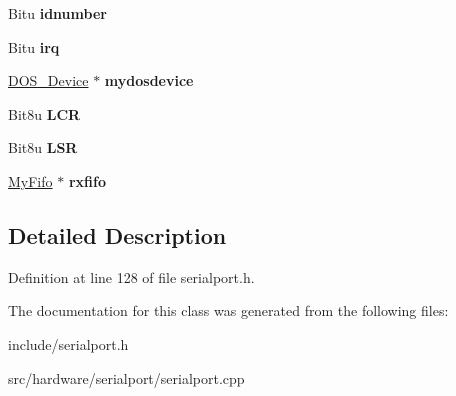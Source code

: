 \begin{DoxyCompactItemize}
\item 
\hypertarget{classCSerial_a8c544ffae840bf00e8185eee2b176ccc}{Bitu {\bfseries idnumber}}\label{classCSerial_a8c544ffae840bf00e8185eee2b176ccc}

\item 
\hypertarget{classCSerial_ac7142618a6f82ffd683cc1a8936fb5eb}{Bitu {\bfseries irq}}\label{classCSerial_ac7142618a6f82ffd683cc1a8936fb5eb}

\item 
\hypertarget{classCSerial_a805edbbeb60acbbb3d06defa286bd8fb}{\hyperlink{classDOS__Device}{D\-O\-S\-\_\-\-Device} $\ast$ {\bfseries mydosdevice}}\label{classCSerial_a805edbbeb60acbbb3d06defa286bd8fb}

\item 
\hypertarget{classCSerial_a5eec4c91bdf04199a3eef2b9c5526762}{Bit8u {\bfseries L\-C\-R}}\label{classCSerial_a5eec4c91bdf04199a3eef2b9c5526762}

\item 
\hypertarget{classCSerial_ab3d298a5b33f7761db6a684fd8d4e941}{Bit8u {\bfseries L\-S\-R}}\label{classCSerial_ab3d298a5b33f7761db6a684fd8d4e941}

\item 
\hypertarget{classCSerial_a590948bc816f7502390abbb3e5c10bc7}{\hyperlink{classMyFifo}{My\-Fifo} $\ast$ {\bfseries rxfifo}}\label{classCSerial_a590948bc816f7502390abbb3e5c10bc7}

\end{DoxyCompactItemize}


\subsection{Detailed Description}


Definition at line 128 of file serialport.\-h.



The documentation for this class was generated from the following files\-:\begin{DoxyCompactItemize}
\item 
include/serialport.\-h\item 
src/hardware/serialport/serialport.\-cpp\end{DoxyCompactItemize}
